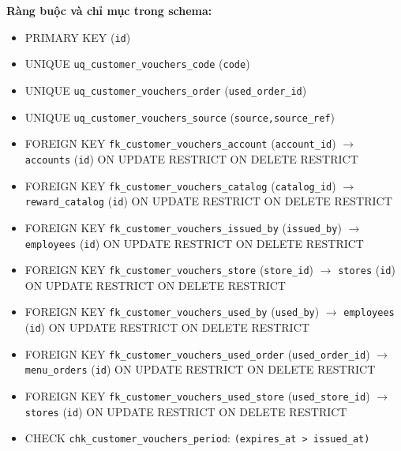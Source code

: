 \textbf{Ràng buộc và chỉ mục trong schema:}

\begin{itemize}

\item PRIMARY KEY (\texttt{id})

\item UNIQUE \texttt{uq\_customer\_vouchers\_code} (\texttt{code})

\item UNIQUE \texttt{uq\_customer\_vouchers\_order} (\texttt{used\_order\_id})

\item UNIQUE \texttt{uq\_customer\_vouchers\_source} (\texttt{source,source\_ref})

\item FOREIGN KEY \texttt{fk\_customer\_vouchers\_account} (\texttt{account\_id}) $\rightarrow$ \texttt{accounts} (\texttt{id}) ON UPDATE RESTRICT ON DELETE RESTRICT

\item FOREIGN KEY \texttt{fk\_customer\_vouchers\_catalog} (\texttt{catalog\_id}) $\rightarrow$ \texttt{reward\_catalog} (\texttt{id}) ON UPDATE RESTRICT ON DELETE RESTRICT

\item FOREIGN KEY \texttt{fk\_customer\_vouchers\_issued\_by} (\texttt{issued\_by}) $\rightarrow$ \texttt{employees} (\texttt{id}) ON UPDATE RESTRICT ON DELETE RESTRICT

\item FOREIGN KEY \texttt{fk\_customer\_vouchers\_store} (\texttt{store\_id}) $\rightarrow$ \texttt{stores} (\texttt{id}) ON UPDATE RESTRICT ON DELETE RESTRICT

\item FOREIGN KEY \texttt{fk\_customer\_vouchers\_used\_by} (\texttt{used\_by}) $\rightarrow$ \texttt{employees} (\texttt{id}) ON UPDATE RESTRICT ON DELETE RESTRICT

\item FOREIGN KEY \texttt{fk\_customer\_vouchers\_used\_order} (\texttt{used\_order\_id}) $\rightarrow$ \texttt{menu\_orders} (\texttt{id}) ON UPDATE RESTRICT ON DELETE RESTRICT

\item FOREIGN KEY \texttt{fk\_customer\_vouchers\_used\_store} (\texttt{used\_store\_id}) $\rightarrow$ \texttt{stores} (\texttt{id}) ON UPDATE RESTRICT ON DELETE RESTRICT

\item CHECK \texttt{chk\_customer\_vouchers\_period}: \texttt{(expires\_at > issued\_at)}


\end{itemize}
